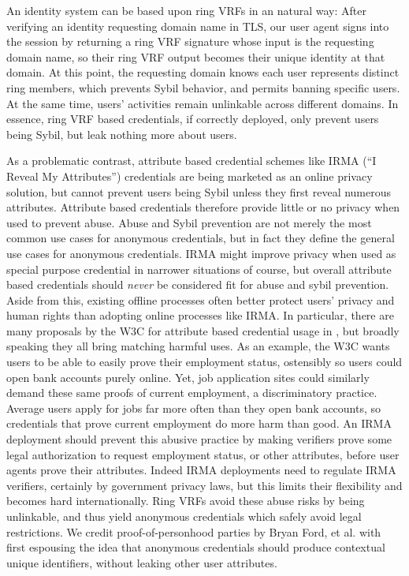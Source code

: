 An identity system can be based upon ring VRFs in an natural way:
After verifying an identity requesting domain name in TLS,
our user agent signs into the session by returning a ring VRF
signature whose input is the requesting domain name, so their
ring VRF output becomes their unique identity at that domain.
At this point, the requesting domain knows each user represents
distinct ring members, which prevents Sybil behavior, and permits
banning specific users.
At the same time, users' activities remain unlinkable across different
domains.
In essence, ring VRF based credentials, if correctly deployed, only
prevent users being Sybil, but leak nothing more about users.  

As a problematic contrast, attribute based credential schemes like
IRMA (``I Reveal My Attributes'') credentials \cite{IRMAcredentials}
are being marketed as an online privacy solution, but cannot prevent
users being Sybil unless they first reveal numerous attributes.
Attribute based credentials therefore provide little or no privacy
when used to prevent abuse.
Abuse and Sybil prevention are not merely the most common use cases for
anonymous credentials, but in fact they define the general use cases for
anonymous credentials.
IRMA might improve privacy when used as special purpose  credential 
in narrower situations of course, but overall attribute based credentials
should {\it never} be considered fit for abuse and sybil prevention.
Aside from this, existing offline processes often better protect users'
privacy and human rights than adopting online processes like IRMA.
In particular, there are many proposals by the W3C for attribute based
credential usage in \cite{w3c_vc_use_cases}, but broadly speaking they
all bring matching harmful uses. %
As an example, the W3C wants users to be able to easily prove their
employment status, ostensibly so users could open bank accounts purely
online.  Yet, job application sites could similarly demand these same
proofs of current employment, a discriminatory practice.
Average users apply for jobs far more often than they open bank accounts,
so credentials that prove current employment do more harm than good.
An IRMA deployment should prevent this abusive practice by making
verifiers prove some legal authorization to request employment status,
or other attributes, before user agents prove their attributes.
Indeed IRMA deployments need to regulate IRMA verifiers, certainly by
government privacy laws,
but this limits their flexibility and becomes hard internationally.
Ring VRFs avoid these abuse risks by being unlinkable, and thus
yield anonymous credentials which safely avoid legal restrictions.
We credit proof-of-personhood parties by Bryan Ford, et al. \cite{pop2008,pop2017}
with first espousing the idea that anonymous credentials should produce
contextual unique identifiers, without leaking other user attributes.

